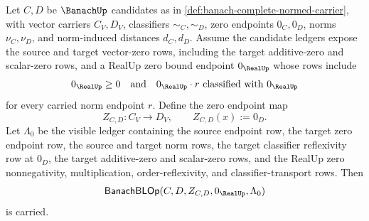 \begin{theorem}
\label{thm:banach-zero-bounded-linear-operator-carrier}
Let $C,D$ be $\BanachUp$ candidates as in \autoref{def:banach-complete-normed-carrier}, with vector carriers $C_V,D_V$, classifiers $\sim_C,\sim_D$, zero endpoints $0_C,0_D$, norms $\nu_C,\nu_D$, and norm-induced distances $d_C,d_D$. Assume the candidate ledgers expose the source and target vector-zero rows, including the target additive-zero and scalar-zero rows, and a RealUp zero bound endpoint $0_{\RealUp}$ whose rows include
$$
0_{\RealUp}\ge 0
\quad\text{and}\quad
0_{\RealUp}\cdot r\ \text{classified with}\ 0_{\RealUp}
$$
for every carried norm endpoint $r$. Define the zero endpoint map
$$
Z_{C,D}:C_V\to D_V,\qquad Z_{C,D}(x):=0_D.
$$
Let $\Lambda_0$ be the visible ledger containing the source endpoint row, the target zero endpoint row, the source and target norm rows, the target classifier reflexivity row at $0_D$, the target additive-zero and scalar-zero rows, and the RealUp zero nonnegativity, multiplication, order-reflexivity, and classifier-transport rows. Then
$$
\mathsf{BanachBLOp}(C,D,Z_{C,D},0_{\RealUp},\Lambda_0)
$$
is carried.
\end{theorem}
